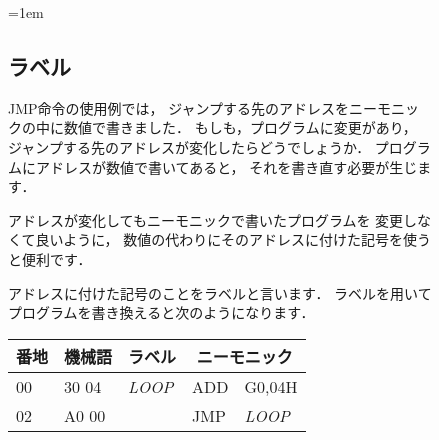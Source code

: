 \begin{figure}[btp]
  \begin{framed}{\parindent=1em
      \subsection*{ラベル}
      JMP命令の使用例では，
      ジャンプする先のアドレスをニーモニックの中に数値で書きました．
      もしも，プログラムに変更があり，
      ジャンプする先のアドレスが変化したらどうでしょうか．
      プログラムにアドレスが数値で書いてあると，
      それを書き直す必要が生じます．

      アドレスが変化してもニーモニックで書いたプログラムを
      変更しなくて良いように，
      数値の代わりにそのアドレスに付けた記号を使うと便利です．

      アドレスに付けた記号のことをラベルと言います．
      ラベルを用いてプログラムを書き換えると次のようになります．

      {\ttfamily\small\begin{center}
        \begin{tabular}{|l|l|l|l l|} \hline
          番地 & 機械語 & ラベル & \multicolumn{2}{|c|}{ニーモニック} \\
          \hline
          00 & 30 04 & \emph{LOOP} & ADD  & G0,04H     \\
          02 & A0 00 &            & JMP  & \emph{LOOP} \\
          \hline
        \end{tabular}
      \end{center}}
  }\end{framed}
\end{figure}

